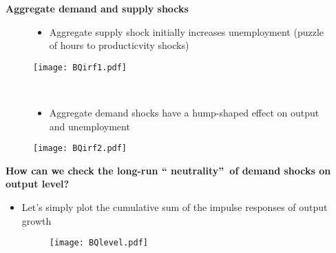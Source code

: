 \documentclass[10pt,handout]{beamer}
\begin{document}
\vspace{.1cm}

\begin{frame}
{\textbf{Aggregate demand and supply shocks}}

\begin{minipage}{.48\textwidth}
\begin{figure}[h]
\begin{flushleft}
\small 
\begin{itemize}
\item Aggregate supply shock initially increases unemployment 
(puzzle of hours to producticvity shocks)
\end{itemize}
\vspace{.3cm}
\texttt{[image: BQirf1.pdf]}
\end{flushleft}
\end{figure}
\end{minipage}\ \pause\ 
\begin{minipage}{.48\textwidth}
\begin{figure}[h]
\begin{flushleft}
\small 
\begin{itemize}
\item Aggregate demand shocks have a hump-shaped effect on output and unemployment
\end{itemize}
\vspace{.3cm}\texttt{[image: BQirf2.pdf]}
\end{flushleft}
\end{figure}
\end{minipage}
\end{frame}

\vspace{.1cm}

\begin{frame}
{\textbf{How can we check the long-run \textquotedblleft
neutrality\textquotedblright\ of demand shocks on output level?}}

\begin{itemize}
\item Let's simply plot the cumulative sum of the impulse responses of
output growth 
\begin{figure}[h]
\centering\texttt{[image: BQlevel.pdf]}
\end{figure}
\end{itemize}
\end{frame}

\vspace{.1cm}
\end{document}
